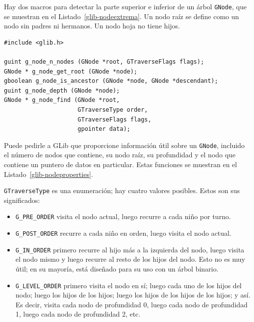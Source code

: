 Hay dos macros para detectar la parte superior e inferior de un árbol \lstinline{GNode}, que se muestran en el Listado~\ref{glib-nodeextrema}. Un nodo raíz se define como un nodo sin padres ni hermanos. Un nodo hoja no tiene hijos.

\begin{lstlisting}[style=GLib/GTK, caption={Propiedades de \lstinline{GNode}}, label=glib-nodeproperties]
#include <glib.h>

guint g_node_n_nodes (GNode *root, GTraverseFlags flags);
GNode * g_node_get_root (GNode *node);
gboolean g_node_is_ancestor (GNode *node, GNode *descendant);
guint g_node_depth (GNode *node);
GNode * g_node_find (GNode *root,
                     GTraverseType order,
                     GTraverseFlags flags,
                     gpointer data);
\end{lstlisting}

Puede pedirle a GLib que proporcione información útil sobre un \lstinline{GNode}, incluido el número de nodos que contiene, su nodo raíz, su profundidad y el nodo que contiene un puntero de datos en particular. Estas funciones se muestran en el Listado~\ref{glib-nodeproperties}.

\lstinline{GTraverseType} es una enumeración; hay cuatro valores posibles. Estos son sus significados:
\begin{itemize}
    \item \lstinline{G_PRE_ORDER} visita el nodo actual, luego recurre a cada niño por turno.
    
    \item \lstinline{G_POST_ORDER} recurre a cada niño en orden, luego visita el nodo actual.
    
    \item \lstinline{G_IN_ORDER} primero recurre al hijo más a la izquierda del nodo, luego visita el nodo mismo y luego recurre al resto de los hijos del nodo. Esto no es muy útil; en su mayoría, está diseñado para su uso con un árbol binario.
    
    \item \lstinline{G_LEVEL_ORDER} primero visita el nodo en sí; luego cada uno de los hijos del nodo; luego los hijos de los hijos; luego los hijos de los hijos de los hijos; y así. Es decir, visita cada nodo de profundidad 0, luego cada nodo de profundidad 1, luego cada nodo de profundidad 2, etc.
\end{itemize}

